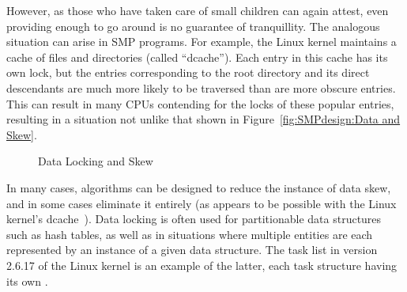However, as those who have taken care of small children can again attest,
even providing enough to go around is no guarantee of tranquillity.
The analogous situation can arise in SMP programs.
For example, the Linux kernel maintains a cache of files and directories
(called ``dcache'').
Each entry in this cache has its own lock, but the entries corresponding
to the root directory and its direct descendants are much more likely to
be traversed than are more obscure entries.
This can result in many CPUs contending for the locks of these popular
entries, resulting in a situation not unlike that
shown in Figure~\ref{fig:SMPdesign:Data and Skew}.

\begin{figure}[htb]
\begin{center}
\end{center}
\caption{Data Locking and Skew}
\end{figure}

In many cases, algorithms can be designed to reduce the instance of
data skew, and in some cases eliminate it entirely
(as appears to be possible with the Linux kernel's dcache~\cite{McKenney04a}).
Data locking is often used for partitionable data structures such as
hash tables, as well as in situations where multiple entities are each
represented by an instance of a given data structure.
The task list in version 2.6.17 of the Linux kernel is an example of the
latter, each task structure having its own .

